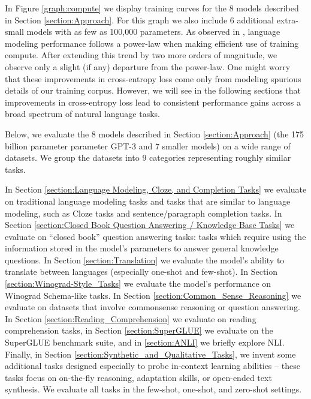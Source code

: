 

In Figure \ref{graph:compute} we display training curves for the 8 models described in Section \ref{section:Approach}. For this graph we also include 6 additional extra-small models with as few as 100,000 parameters. As observed in \cite{kaplan2020scaling}, language modeling performance follows a power-law when making efficient use of training compute. After extending this trend by two more orders of magnitude, we observe only a slight (if any) departure from the power-law. One might worry that these improvements in cross-entropy loss come only from modeling spurious details of our training corpus. However, we will see in the following sections that improvements in cross-entropy loss lead to consistent performance gains across a broad spectrum of natural language tasks.

Below, we evaluate the 8 models described in Section \ref{section:Approach} (the 175 billion parameter parameter GPT-3 and 7 smaller models) on a wide range of datasets. We group the datasets into 9 categories representing roughly similar tasks.  

In Section \ref{section:Language Modeling, Cloze, and Completion Tasks} we evaluate on traditional language modeling tasks and tasks that are similar to language modeling, such as Cloze tasks and sentence/paragraph completion tasks.  In Section \ref{section:Closed Book Question Answering / Knowledge Base Tasks} we evaluate on ``closed book'' question answering tasks: tasks which require using the information stored in the model’s parameters to answer general knowledge questions.  In Section \ref{section:Translation} we evaluate the model’s ability to translate between languages (especially one-shot and few-shot).  In Section \ref{section:Winograd-Style_Tasks} we evaluate the model’s performance on Winograd Schema-like tasks.  In Section \ref{section:Common_Sense_Reasoning} we evaluate on datasets that involve commonsense reasoning or question answering.  In Section \ref{section:Reading_Comprehension} we evaluate on reading comprehension tasks, in Section \ref{section:SuperGLUE} we evaluate on the SuperGLUE benchmark suite, and in \ref{section:ANLI} we briefly explore NLI.  Finally, in Section \ref{section:Synthetic_and_Qualitative_Tasks}, we invent some additional tasks designed especially to probe in-context learning abilities -- these tasks focus on on-the-fly reasoning, adaptation skills, or open-ended text synthesis. We evaluate all tasks in the few-shot, one-shot, and zero-shot settings.

